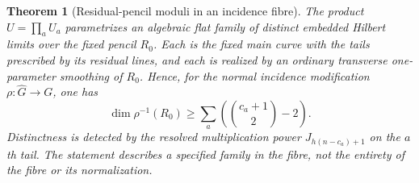 \documentclass[11pt,reqno]{amsart}
\numberwithin{equation}{section}
\newtheorem{theorem}{Theorem}[section]
\theoremstyle{definition}\newtheorem{definition}[theorem]{Definition}
\theoremstyle{remark}\newtheorem{remark}[theorem]{Remark}
\begin{document}
\begin{theorem}[Residual-pencil moduli in an incidence fibre]
\label{thm:boundary-moduli-v159}
The product $U=\prod_aU_a$ parametrizes an algebraic flat family of
distinct embedded Hilbert limits over the fixed pencil $R_0$.
Each is the fixed main curve with the tails prescribed by its
residual lines, and each is realized by an ordinary transverse
one-parameter smoothing of $R_0$. Hence, for the normal incidence
modification $\rho:\widehat G\to G$, one has
\begin{equation}\label{eq:boundary-fibre-dimension-v159}
                \dim\rho^{-1}(R_0)\geq
                    \sum_a\left(\binom{c_a+1}{2}-2\right).
\end{equation}
Distinctness is detected by the resolved multiplication power
$J_{h(n-c_a)+1}$ on the $a$th tail. The statement describes a specified
family in the fibre, not the entirety of the fibre or its normalization.
\end{theorem}
\end{document}
